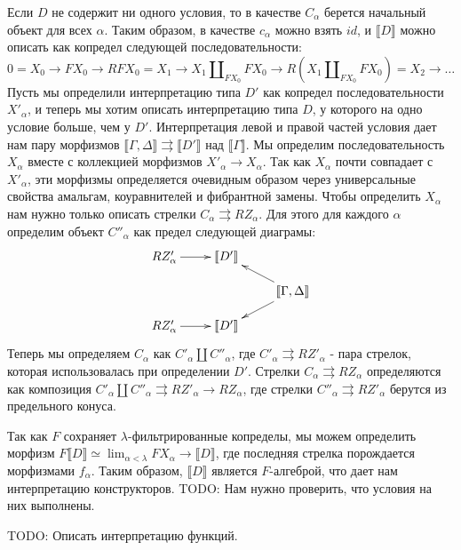 \documentclass{amsart}
\theoremstyle{definition}
\theoremstyle{remark}
\renewcommand{\ll}{\llbracket}
\newcommand{\rr}{\rrbracket}
\numberwithin{figure}{section}
\begin{document}
Если $D$ не содержит ни одного условия, то в качестве $C_\alpha$ берется начальный объект для всех $\alpha$.
Таким образом, в качестве $c_\alpha$ можно взять $id$, и $\ll D \rr$ можно описать как копредел следующей последовательности:
\[ 0 = X_0 \to F X_0 \to R F X_0 = X_1 \to X_1 \amalg_{F X_0} F X_0 \to R (X_1 \amalg_{F X_0} F X_0) = X_2 \to \ldots \]
Пусть мы определили интерпретацию типа $D'$ как копредел последовательности $X'_\alpha$, и теперь мы хотим описать интерпретацию типа $D$, у которого на одно условие больше, чем у $D'$.
Интерпретация левой и правой частей условия дает нам пару морфизмов $\ll \Gamma, \Delta \rr \rightrightarrows \ll D' \rr$ над $\ll \Gamma \rr$.
Мы определим последовательность $X_\alpha$ вместе с коллекцией морфизмов $X'_\alpha \to X_\alpha$.
Так как $X_\alpha$ почти совпадает с $X'_\alpha$, эти морфизмы определяется очевидным образом через универсальные свойства амальгам, коуравнителей и фибрантной замены.
Чтобы определить $X_\alpha$ нам нужно только описать стрелки $C_\alpha \rightrightarrows R Z_\alpha$.
Для этого для каждого $\alpha$ определим объект $C''_\alpha$ как предел следующей диаграмы:
\[ \xymatrix@R-1pc{ R Z'_\alpha \ar[r] & \ll D' \rr & \\
                                       &            & \ll \Gamma, \Delta \rr \ar[ul] \ar[dl] \\
                    R Z'_\alpha \ar[r] & \ll D' \rr &
            } \]
Теперь мы определяем $C_\alpha$ как $C'_\alpha \amalg C''_\alpha$, где $C'_\alpha \rightrightarrows R Z'_\alpha$ - пара стрелок, которая использовалась при определении $D'$.
Стрелки $C_\alpha \rightrightarrows R Z_\alpha$ определяются как композиция $C'_\alpha \amalg C''_\alpha \rightrightarrows R Z'_\alpha \to R Z_\alpha$,
    где стрелки $C''_\alpha \rightrightarrows R Z'_\alpha$ берутся из предельного конуса.

Так как $F$ сохраняет $\lambda$-фильтрированные копределы, мы можем определить морфизм $F \ll D \rr \simeq \lim_{\alpha < \lambda} F X_\alpha \to \ll D \rr$,
    где последняя стрелка порождается морфизмами $f_\alpha$.
Таким образом, $\ll D \rr$ является $F$-алгеброй, что дает нам интерпретацию конструкторов.
TODO: Нам нужно проверить, что условия на них выполнены.

TODO: Описать интерпретацию функций.
\end{document}

